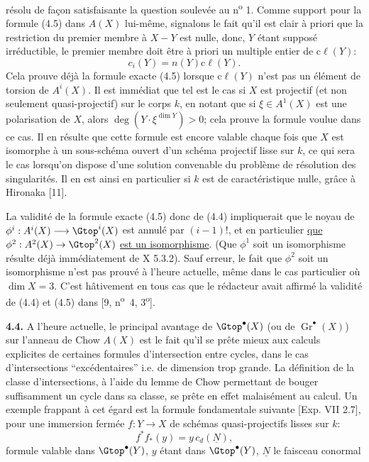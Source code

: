 
résolu de
façon satisfaisante la question soulevée au n\textsuperscript{o} 1. Comme support pour la formule (4.5) dans $A(X)$ lui-même, signalons le fait qu'il est clair à priori que la restriction du premier membre à $X-Y$ est nulle, donc, $Y$ étant supposé irréductible, le premier membre doit être à priori un multiple entier de $\mathrm{c}\ell(Y)$:
\[
 c_i(Y)=n(Y)\mathrm{c}\ell(Y).
\]
Cela prouve déjà la formule exacte (4.5) lorsque $\mathrm{c}\ell(Y)$ n'est pas un élément de torsion de $A^i(X)$. Il est immédiat que tel est le cas si $X$ est projectif (et non seulement quasi-projectif) sur le corps $k$, en notant que si $\xi\in A^1(X)$ est une polarisation de $X$, alors $\deg(Y\cdot\xi^{\dim Y})>0$; cela prouve la formule voulue dans ce cas. Il en résulte que cette formule est encore valable chaque fois que $X$ est isomorphe à un sous-schéma ouvert d'un schéma projectif lisse sur $k$, ce qui sera le cas lorsqu'on dispose d'une solution convenable du problème de résolution des singularités. Il en est ainsi en particulier si $k$ est de caractéristique nulle, grâce à Hironaka [11].

La validité de la formule exacte (4.5) donc de (4.4) impliquerait que le noyau de $\phi^i:A^i(X)\longrightarrow \Gtop^i(X)$ est annulé par $(i-1)!$, et en particulier \uline{que} $\phi^2:A^2(X)\to\Gtop^2(X)$ \uline{est un isomorphisme}. (Que $\phi^1$ soit un isomorphisme résulte déjà immédiatement de X 5.3.2). Sauf erreur, le fait que $\phi^2$ soit un isomorphisme n'est pas prouvé à l'heure actuelle, même dans le cas particulier où $\dim X=3$. C'est hâtivement en tous cas que le rédacteur avait affirmé la validité de (4.4) et (4.5) dans [9, n\textsuperscript{o}~4, 3\textsuperscript{o}].

\textbf{4.4.} A l'heure actuelle, le principal avantage de $\Gtop^\bullet(X)$ (ou de $\operatorname{Gr}^\bullet(X)$) sur l'anneau de Chow $A(X)$ est le fait qu'il se prête mieux aux calculs explicites de certaines formules d'intersection entre cycles, dans le cas d'intersections ``excédentaires'' i.e. de dimension trop grande. La définition de la classe d'intersections, à l'aide du lemme de Chow permettant de bouger suffisamment un cycle dans sa classe, se prête en effet malaisément au calcul. Un exemple frappant à cet égard est la formule fondamentale suivante [Exp. VII 2.7], pour une immersion fermée $f:Y\to X$ de schémas quasi-projectifs lisses sur $k$:
\begin{equation}\tag{4.6}
 f^*f_*(y)=y\,c_d(\underline{N}),
\end{equation}
formule valable dans $\Gtop^\bullet(Y)$, $y$ étant dans $\Gtop^\bullet(Y)$, $\underline{N}$ le faisceau conormal 
